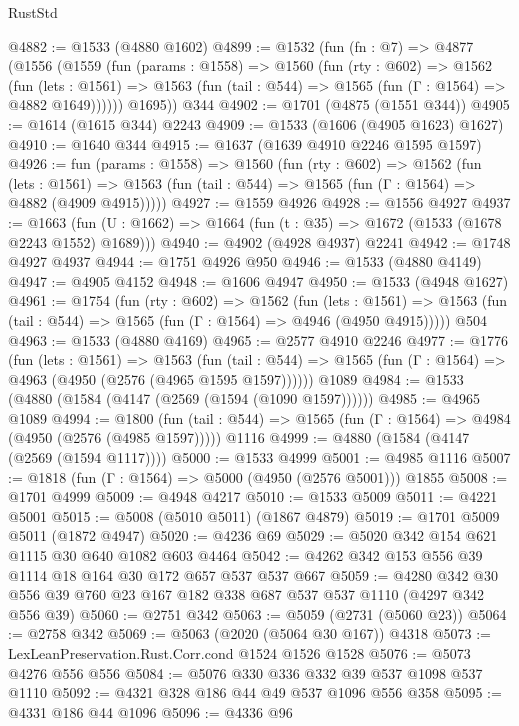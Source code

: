 \begin{lexlean}{RustStd}
\begin{coremodule}
@4882 := @1533 (@4880 @1602)
@4899 := @1532
    (fun (fn : @7) =>
    @4877
      (@1556
        (@1559
          (fun (params : @1558) =>
          @1560
            (fun (rty : @602) =>
            @1562
              (fun (lets : @1561) =>
              @1563 (fun (tail : @544) => @1565 (fun (Γ : @1564) => @4882 @1649))))))
        @1695))
    @344
@4902 := @1701 (@4875 (@1551 @344))
@4905 := @1614 (@1615 @344) @2243
@4909 := @1533 (@1606 (@4905 @1623) @1627)
@4910 := @1640 @344
@4915 := @1637 (@1639 @4910 @2246 @1595 @1597)
@4926 := fun (params : @1558) =>
  @1560
    (fun (rty : @602) =>
    @1562
      (fun (lets : @1561) =>
      @1563 (fun (tail : @544) => @1565 (fun (Γ : @1564) => @4882 (@4909 @4915)))))
@4927 := @1559 @4926
@4928 := @1556 @4927
@4937 := @1663 (fun (U : @1662) => @1664 (fun (t : @35) => @1672 (@1533 (@1678 @2243 @1552) @1689)))
@4940 := @4902 (@4928 @4937) @2241
@4942 := @1748 @4927 @4937
@4944 := @1751 @4926 @950
@4946 := @1533 (@4880 @4149)
@4947 := @4905 @4152
@4948 := @1606 @4947
@4950 := @1533 (@4948 @1627)
@4961 := @1754
    (fun (rty : @602) =>
    @1562
      (fun (lets : @1561) =>
      @1563 (fun (tail : @544) => @1565 (fun (Γ : @1564) => @4946 (@4950 @4915)))))
    @504
@4963 := @1533 (@4880 @4169)
@4965 := @2577 @4910 @2246
@4977 := @1776
    (fun (lets : @1561) =>
    @1563
      (fun (tail : @544) => @1565 (fun (Γ : @1564) => @4963 (@4950 (@2576 (@4965 @1595 @1597))))))
    @1089
@4984 := @1533 (@4880 (@1584 (@4147 (@2569 (@1594 (@1090 @1597))))))
@4985 := @4965 @1089
@4994 := @1800
    (fun (tail : @544) => @1565 (fun (Γ : @1564) => @4984 (@4950 (@2576 (@4985 @1597)))))
    @1116
@4999 := @4880 (@1584 (@4147 (@2569 (@1594 @1117))))
@5000 := @1533 @4999
@5001 := @4985 @1116
@5007 := @1818 (fun (Γ : @1564) => @5000 (@4950 (@2576 @5001))) @1855
@5008 := @1701 @4999
@5009 := @4948 @4217
@5010 := @1533 @5009
@5011 := @4221 @5001
@5015 := @5008 (@5010 @5011) (@1867 @4879)
@5019 := @1701 @5009 @5011 (@1872 @4947)
@5020 := @4236 @69
@5029 := @5020 @342 @154 @621 @1115 @30 @640 @1082 @603 @4464
@5042 := @4262 @342 @153 @556 @39 @1114 @18 @164 @30 @172 @657 @537 @537 @667
@5059 := @4280 @342 @30 @556 @39 @760 @23 @167 @182 @338 @687 @537 @537 @1110 (@4297 @342 @556 @39)
@5060 := @2751 @342
@5063 := @5059 (@2731 (@5060 @23))
@5064 := @2758 @342
@5069 := @5063 (@2020 (@5064 @30 @167)) @4318
@5073 := LexLeanPreservation.Rust.Corr.cond @1524 @1526 @1528
@5076 := @5073 @4276 @556 @556
@5084 := @5076 @330 @336 @332 @39 @537 @1098 @537 @1110
@5092 := @4321 @328 @186 @44 @49 @537 @1096 @556 @358
@5095 := @4331 @186 @44 @1096
@5096 := @4336 @96

\end{coremodule}
\end{lexlean}
